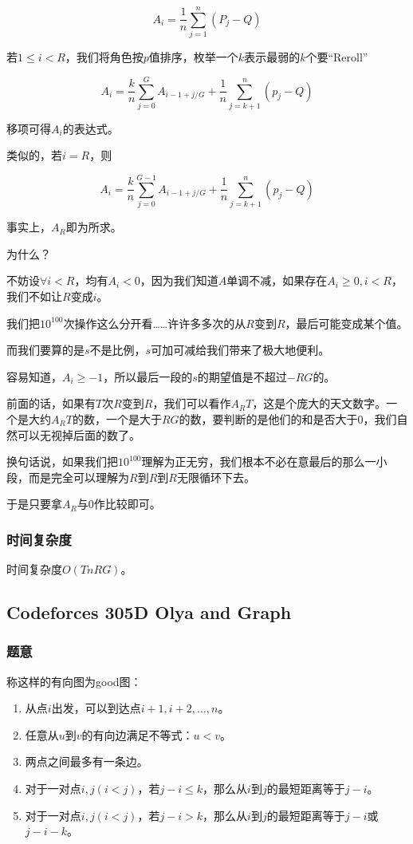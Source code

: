\documentclass{ctexart}
\begin{document}
\[A_i=\frac{1}{n}\sum_{j=1}^n (P_j-Q)\]

若$1 \le i < R$，我们将角色按$p$值排序，枚举一个$k$表示最弱的$k$个要``Reroll''
	
\[A_i=\frac{k}{n}\sum_{j=0}^G A_{i-1+j/G}+\frac{1}{n}\sum_{j=k+1}^n(p_j-Q)\]

移项可得$A_i$的表达式。

类似的，若$i=R$，则

\[A_i=\frac{k}{n}\sum_{j=0}^{G-1} A_{i-1+j/G}+\frac{1}{n}\sum_{j=k+1}^n(p_j-Q)\]

事实上，$A_R$即为所求。

为什么？

不妨设$\forall i<R$，均有$A_i<0$，因为我们知道$A$单调不减，如果存在$A_i \ge 0 ,i<R$，我们不如让$R$变成$i$。

我们把$10^{100}$次操作这么分开看……许许多多次的从$R$变到$R$，最后可能变成某个值。

而我们要算的是$s$不是比例，$s$可加可减给我们带来了极大地便利。

容易知道，$A_i \ge -1$，所以最后一段的$s$的期望值是不超过$-RG$的。

前面的话，如果有$T$次$R$变到$R$，我们可以看作$A_RT$，这是个庞大的天文数字。一个是大约$A_RT$的数，一个是大于$RG$的数，要判断的是他们的和是否大于0，我们自然可以无视掉后面的数了。

换句话说，如果我们把$10^{100}$理解为正无穷，我们根本不必在意最后的那么一小段，而是完全可以理解为$R$到$R$到$R$无限循环下去。

于是只要拿$A_R$与$0$作比较即可。
\subsubsection{时间复杂度}
时间复杂度$O(TnRG)$。
\subsection{Codeforces 305D Olya and Graph}
\subsubsection{题意}
称这样的有向图为good图：

\begin{enumerate}
\item 从点$i$出发，可以到达点$i+1,i+2,\ldots,n$。
\item 任意从$u$到$v$的有向边满足不等式：$u<v$。
\item 两点之间最多有一条边。
\item 对于一对点$i,j(i<j)$，若$j-i \le k$，那么从$i$到$j$的最短距离等于$j-i$。
\item 对于一对点$i,j(i<j)$，若$j-i>k$，那么从$i$到$j$的最短距离等于$j-i$或$j-i-k$。
\end{enumerate}
\end{document}
